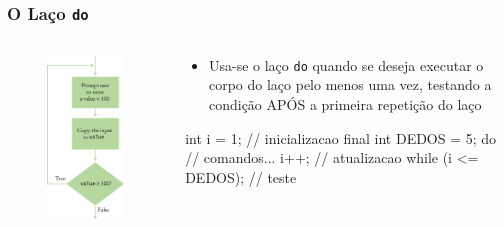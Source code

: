 \documentclass[xcolor={dvipsnames,table},aspectratio=169]{beamer}
\begin{document}
\begin{frame}[fragile]\frametitle{O Laço \texttt{do}}
\begin{columns}[T]
	\begin{column}{0.3\linewidth}
\begin{figure}[h]
	\includegraphics[height=0.65\paperheight,center]{pucrs-ep-fprog-unidade_04-lacos-laminas-fluxograma_laco_do.png}
\end{figure}
	\end{column}
	\begin{column}{0.7\linewidth}
\begin{itemize}
	\item Usa-se o laço \texttt{do} quando se deseja executar o corpo do laço pelo menos uma vez, testando a condição APÓS a primeira repetição do laço
\end{itemize}
\begin{javacode}
int i = 1;  // inicializacao
final int DEDOS = 5;
do {
   // comandos...
   i++; // atualizacao
}  while (i <= DEDOS);  // teste
\end{javacode}
	\end{column}
\end{columns}

\end{frame}
\end{document}
